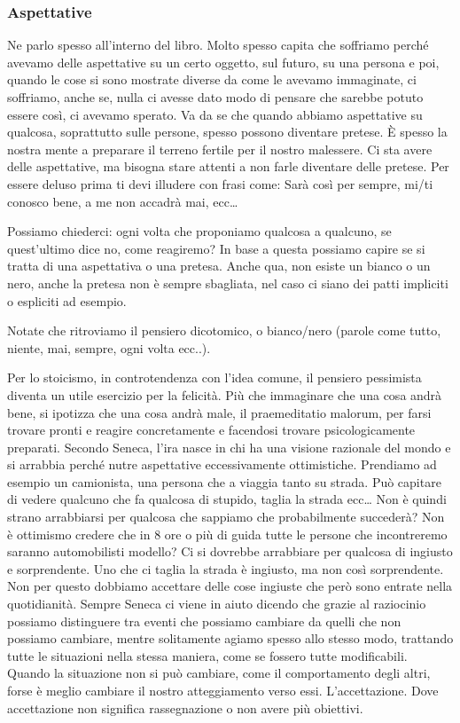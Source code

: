 \documentclass[12pt]{book} %
\begin{document}
\subsubsection{Aspettative}
Ne parlo spesso all'interno del libro. Molto spesso capita che soffriamo perché avevamo delle
aspettative su un certo oggetto, sul futuro, su una persona e poi, quando le cose si sono mostrate diverse da come le avevamo
immaginate, ci soffriamo, anche se, nulla ci avesse dato modo di pensare che sarebbe potuto essere così, ci avevamo
sperato. Va da se che quando abbiamo aspettative su qualcosa, soprattutto sulle persone, spesso possono diventare pretese. È spesso
la nostra mente a preparare il terreno fertile per il nostro malessere.
Ci sta avere delle aspettative, ma bisogna stare attenti a non farle diventare delle pretese. 
Per essere deluso prima ti devi illudere con frasi come: Sarà così per sempre, mi/ti conosco bene, a me non accadrà mai, ecc…

Possiamo chiederci: ogni volta che proponiamo qualcosa a qualcuno, se quest'ultimo dice no, come reagiremo? In base a
questa possiamo capire se si tratta di una aspettativa o una pretesa. Anche qua, non esiste un bianco o un nero, anche
la pretesa non è sempre sbagliata, nel caso ci siano dei patti impliciti o espliciti ad esempio.

Notate che ritroviamo il pensiero dicotomico, o bianco/nero (parole come tutto, niente, mai, sempre, ogni volta ecc..).

Per lo stoicismo, in controtendenza con l'idea comune, il pensiero pessimista diventa un utile
esercizio per la felicità. Più che immaginare che una cosa andrà bene, si ipotizza che una cosa andrà male, il praemeditatio malorum, per farsi
trovare pronti e reagire concretamente e facendosi trovare psicologicamente preparati. Secondo Seneca, l'ira nasce in chi ha una visione razionale del mondo e si arrabbia perché nutre aspettative eccessivamente ottimistiche. Prendiamo ad esempio un
camionista, una persona che a viaggia tanto su strada. Può capitare di vedere qualcuno che fa qualcosa di stupido,
taglia la strada ecc… Non è quindi strano arrabbiarsi per qualcosa che sappiamo che probabilmente succederà? Non è
ottimismo credere che in 8 ore o più di guida tutte le persone che incontreremo saranno automobilisti modello? Ci si dovrebbe
arrabbiare per qualcosa di ingiusto e sorprendente. Uno che ci taglia la strada è ingiusto, ma non così
sorprendente. Non per questo dobbiamo accettare delle cose ingiuste che però sono entrate nella quotidianità. Sempre
Seneca ci viene in aiuto dicendo che grazie al raziocinio possiamo distinguere tra eventi che possiamo cambiare da
quelli che non possiamo cambiare, mentre solitamente agiamo spesso allo stesso modo, trattando tutte le situazioni nella stessa maniera, come se fossero tutte modificabili. Quando la situazione non si può cambiare, come il comportamento degli altri, forse è meglio cambiare il nostro atteggiamento verso essi. L'accettazione. Dove accettazione non significa rassegnazione o non avere più obiettivi.
\end{document}
